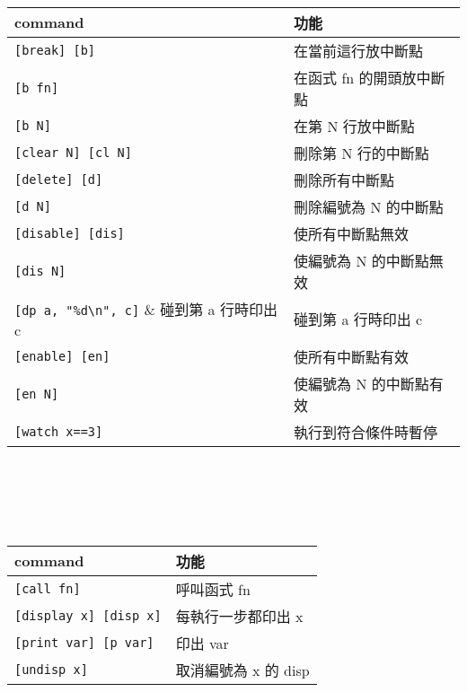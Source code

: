 \begin{center}
     \\
    \begin{tabular}{|p{2.28cm}|p{2.68cm}|}
        \hline
        command                         & 功能 \\
        \hline
        \verb|[break] [b]|              & 在當前這行放中斷點 \\
        \verb|[b fn]|                   & 在函式 fn 的開頭放中斷點 \\
        \verb|[b N]|                    & 在第 N 行放中斷點 \\
        \verb|[clear N] [cl N]|         & 刪除第 N 行的中斷點 \\
        \verb|[delete] [d]|             & 刪除所有中斷點 \\
        \verb|[d N]|                    & 刪除編號為 N 的中斷點 \\
        \verb|[disable] [dis]|          & 使所有中斷點無效 \\
        \verb|[dis N]|                  & 使編號為 N 的中斷點無效 \\
        \verb|[dp a, "%d\n", c]|        & 碰到第 a 行時印出 c \\
        \verb|[enable] [en]|            & 使所有中斷點有效 \\
        \verb|[en N]|                   & 使編號為 N 的中斷點有效 \\
        \verb|[watch x==3]|             & 執行到符合條件時暫停 \\
        \hline
    \end{tabular} \\
    \hspace{\fill} \\
    \hspace{\fill} \\

     \\
    \begin{tabular}{|p{2.28cm}|p{2.68cm}|}
        \hline
        command                         & 功能 \\
        \hline
        \verb|[call fn]|                & 呼叫函式 fn \\
        \verb|[display x] [disp x]|     & 每執行一步都印出 x \\
        \verb|[print var] [p var]|      & 印出 var \\
        \verb|[undisp x]|               & 取消編號為 x 的 disp \\
        \hline
    \end{tabular} \\
    \hspace{\fill} \\
    \hspace{\fill} \\


\end{center}
